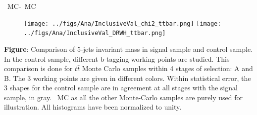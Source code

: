 \begin{frame}{\ttbar~MC-\ttbar~MC}
\vspace{-.2cm}
\begin{figure}[!Hhtbp]
  \begin{center}
    \texttt{[image: ../figs/Ana/InclusiveVal\_chi2\_ttbar.png]}
    \texttt{[image: ../figs/Ana/InclusiveVal\_DRWH\_ttbar.png]}
  \end{center}
\end{figure}

\vspace{-.2cm}
    \begin{block}{}\tiny
      \textbf{Figure}: Comparison of 5-jets invariant mass in signal sample and control sample. In the control sample, different b-tagging working points are studied. This comparison is done for $t\bar{t}$ Monte Carlo samples within 4 stages of selection: A and B. The 3 working points are given in different colors. Within statistical error, the 3 shapes for the control sample are in agreement at all stages with the signal sample, in gray. \ttbar~MC as all the other Monte-Carlo samples are purely used for illustration. All histograms have been normalized to unity.
    \end{block}

\end{frame}

